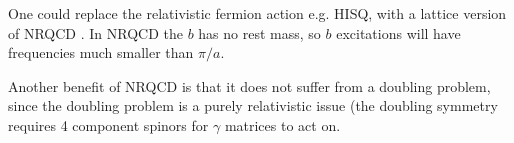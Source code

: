One could replace the relativistic fermion action e.g. HISQ, with a lattice version of NRQCD \cite{Lepage:1992tx}. In NRQCD the $b$ has no rest mass, so $b$ excitations will have frequencies much smaller than $\pi/a$.



    Another benefit of NRQCD is that it does not suffer from a doubling problem, since the doubling problem is a purely relativistic issue (the doubling symmetry requires 4 component spinors for $\gamma$ matrices to act on.


